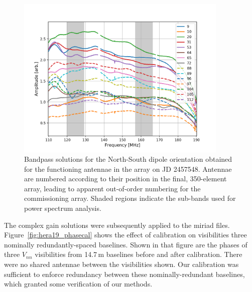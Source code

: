 \begin{figure}
\centering
\includegraphics[width=0.9\textwidth]{chapters/eor_window_HERA/figures/h19_2457458_abs_smallzoom.png}
\caption[Bandpass solutions for the North-South dipole orientation obtained for the functioning antennae in the array on JD 2457548.]{Bandpass solutions for the North-South dipole orientation obtained for the functioning antennae in the array on JD 2457548. Antennae are numbered according to their position in the final, 350-element array, leading to apparent out-of-order numbering for the commissioning array. Shaded regions indicate the sub-bands used for power spectrum analysis.}
\label{fig:hera19_bandpass}
\end{figure}

The complex gain solutions were subsequently applied to the {\sc miriad} files. Figure~\ref{fig:hera19_phasecal} shows the effect of calibration on visibilities three nominally redundantly-spaced baselines. Shown in that figure are the phases of three $V_{nn}$ visibilities from 14.7\,m baselines before and after calibration. There were no shared antennae between the visibilities shown. Our calibration was sufficient to enforce redundancy between these nominally-redundant baselines, which granted some verification of our methods.

